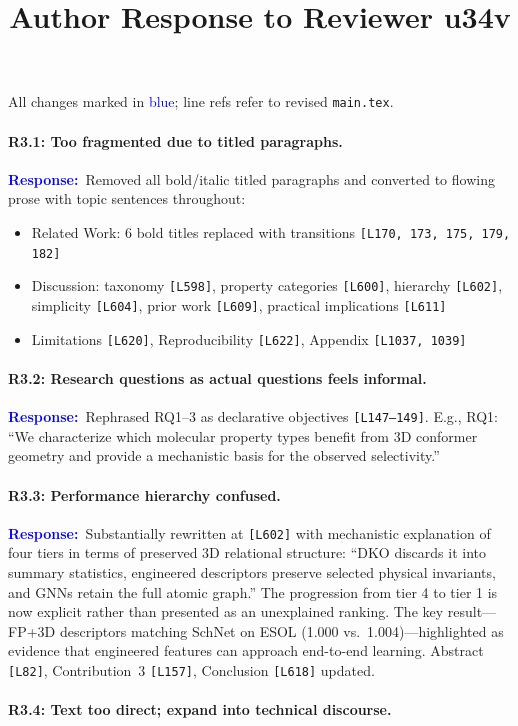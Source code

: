 \documentclass[11pt]{article}
\title{Author Response to Reviewer u34v}
\author{}
\date{}
\newcommand{\point}[1]{\paragraph{#1}}
\newcommand{\response}{\textcolor{blue}{\textbf{Response:}}~}
\newcommand{\lines}[1]{\texttt{[L#1]}}
\begin{document}
\maketitle
\vspace{-2em}

All changes marked in \textcolor{blue}{blue}; line refs refer to revised \texttt{main.tex}.

\point{R3.1: Too fragmented due to titled paragraphs.}

\response Removed all bold/italic titled paragraphs and converted to flowing prose with topic sentences throughout:
\begin{itemize}[itemsep=1pt, topsep=2pt]
    \item Related Work: 6 bold titles replaced with transitions \lines{170, 173, 175, 179, 182}
    \item Discussion: taxonomy \lines{598}, property categories \lines{600}, hierarchy \lines{602}, simplicity \lines{604}, prior work \lines{609}, practical implications \lines{611}
    \item Limitations \lines{620}, Reproducibility \lines{622}, Appendix \lines{1037, 1039}
\end{itemize}

\point{R3.2: Research questions as actual questions feels informal.}

\response Rephrased RQ1--3 as declarative objectives \lines{147--149}. E.g., RQ1: ``We characterize which molecular property types benefit from 3D conformer geometry and provide a mechanistic basis for the observed selectivity.''

\point{R3.3: Performance hierarchy confused.}

\response Substantially rewritten at \lines{602} with mechanistic explanation of four tiers in terms of preserved 3D relational structure: ``DKO discards it into summary statistics, engineered descriptors preserve selected physical invariants, and GNNs retain the full atomic graph.'' The progression from tier 4 to tier 1 is now explicit rather than presented as an unexplained ranking. The key result---FP+3D descriptors matching SchNet on ESOL (1.000 vs.\ 1.004)---highlighted as evidence that engineered features can approach end-to-end learning. Abstract \lines{82}, Contribution~3 \lines{157}, Conclusion \lines{618} updated.

\point{R3.4: Text too direct; expand into technical discourse.}
\end{document}

